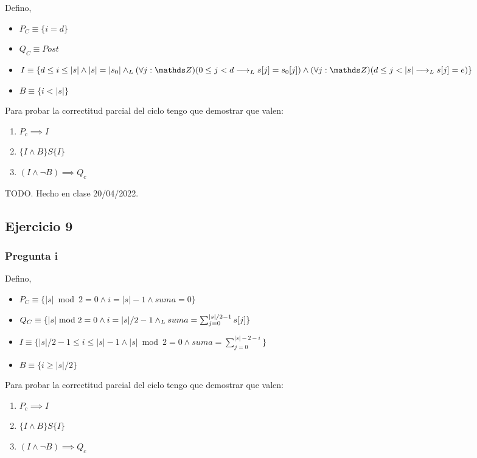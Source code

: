 Defino,
\begin{itemize}
    \item $ P_C \equiv \{ i = d \} $
    \item $ Q_C \equiv Post $
    \item $ I \equiv \{ d \leq i \leq |s| \wedge |s| = |s_0| \yLuego (\forall j: \ent)(0 \leq j < d \implicaLuego s[j] = s_0[j]) \wedge (\forall j: \ent)(d \leq j < |s| \implicaLuego s[j] = e) \} $
    \item $ B \equiv \{ i < |s| \} $
\end{itemize}

Para probar la correctitud parcial del ciclo tengo que demostrar que valen:
\begin{enumerate}[label=(\alph*)]
    \item $ P_c \implies I $
    \item $ \{ I \wedge B \} S \{ I \} $
    \item $ (I \wedge \neg B) \implies Q_c $
\end{enumerate}

TODO. Hecho en clase 20/04/2022.

\subsection{Ejercicio 9}

\subsubsection{Pregunta i}

Defino,
\begin{itemize}
    \item $ P_C \equiv \{ |s| \bmod 2 = 0 \wedge i = |s| - 1\wedge suma = 0 \} $
    \item $ Q_C \equiv \{ |s| \bmod 2 = 0 \wedge i = |s| / 2 -1 \land _L suma = \sum_{j=0}^{|s|/2-1}s[j] \} $
    \item $ I \equiv \{ |s|/2 - 1 \leq i \leq |s|-1 \wedge |s| \bmod 2 = 0 \wedge suma = \sum_{j=0}^{|s|-2-i} \} $
    \item $ B \equiv \{ i \geq |s|/2 \} $
\end{itemize}

Para probar la correctitud parcial del ciclo tengo que demostrar que valen:
\begin{enumerate}[label=(\alph*)]
    \item $ P_c \implies I $
    \item $ \{ I \wedge B \} S \{ I \} $
    \item $ (I \wedge \neg B) \implies Q_c $
\end{enumerate}

